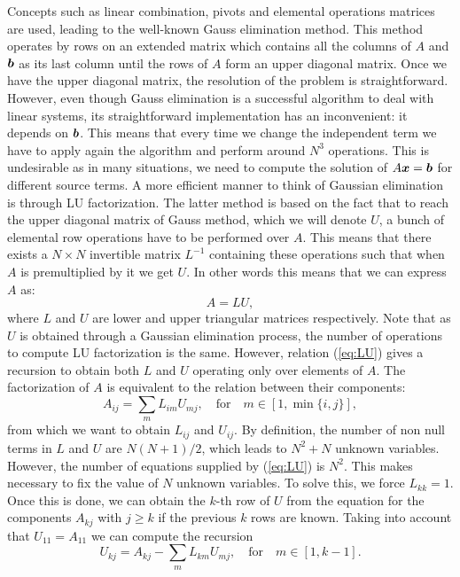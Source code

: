  Concepts such as linear combination, pivots and elemental operations matrices are used, leading to the well-known Gauss elimination method. This method operates by rows on an extended matrix which contains all the columns of $A$ and $\boldsymbol{b}$ as its last column until the rows of $A$ form an upper diagonal matrix. Once we have the upper diagonal matrix, the resolution of the problem is straightforward. However, even though Gauss elimination is a successful algorithm to deal with linear systems, its straightforward implementation has an inconvenient: it depends on $\boldsymbol{b}$. This means that every time we change the independent term we have to apply again the algorithm and perform around $N^3$ operations. This is undesirable as in many situations, we need to compute the solution of $A\boldsymbol{x}=\boldsymbol{b}$ for different source terms. A more efficient manner to think of Gaussian elimination is through LU factorization. The latter method is based on the fact that to reach the upper diagonal matrix of Gauss method, which we will denote $U$, a bunch of elemental row operations have to be performed over $A$. This means that there exists a $N\times N$ invertible matrix $L^{-1}$ containing these operations such that when $A$ is premultiplied by it we get $U$. In other words this means that we can express $A$ as:
 \begin{equation}
 A = LU, \label{eq:LU}
 \end{equation}
 where $L$ and $U$ are lower and upper triangular matrices respectively. Note that as $U$ is obtained through a Gaussian elimination process, the number of operations to compute LU factorization is the same. However, relation (\ref{eq:LU}) gives a recursion to obtain both $L$ and $U$ operating only over elements of $A$. The factorization of $A$ is equivalent to the relation between their components:
 \begin{equation}
 A_{ij}= \sum_{m}L_{im} U_{mj}, \quad \mbox{for} \quad m\in[1,\min \{i,j\}], \label{eq:ALU}
 \end{equation}
 from which we want to obtain $L_{ij}$ and $U_{ij}$. By definition, the number of non null terms in $L$ and $U$ are $N(N+1)/2$, which leads to $N^2 + N$ unknown variables. However, the number of equations supplied by (\ref{eq:LU}) is $N^2$. This makes necessary to fix the value of $N$ unknown variables. To solve this, we force $L_{kk}=1$. Once this is done, we can obtain the $k$-th row of $U$ from the equation for the components $A_{kj}$ with $j\geq k$ if the previous $k$ rows are known. Taking into account that $U_{11}=A_{11}$ we can compute the recursion
  \begin{equation}
 U_{kj} = {A_{kj} - \sum_{m} L_{km}U_{mj} }, 
 \quad \mbox{for} \quad m \in [1,k-1]. \label{eq:recurrence_b}
 \end{equation}
 
